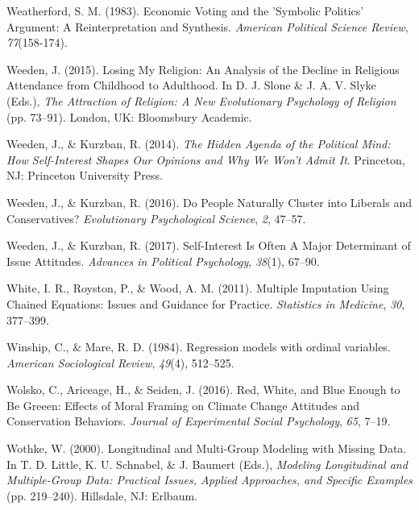 \documentclass[12pt,econ]{sources/authesis}
\newenvironment{CSLReferences}%
  {}%
  {\par}
\begin{document}
\begin{CSLReferences}{1}{0}
\leavevmode{}%
Weatherford, S. M. (1983). Economic {Voting} and the '{Symbolic} {Politics}' {Argument}: {A} {Reinterpretation} and {Synthesis}. \emph{American Political Science Review}, \emph{77}(158-174).

\leavevmode{}%
Weeden, J. (2015). {Losing My Religion: An Analysis of the Decline in Religious Attendance from Childhood to Adulthood}. In D. J. Slone \& J. A. V. Slyke (Eds.), \emph{{The Attraction of Religion: A New Evolutionary Psychology of Religion}} (pp. 73--91). London, UK: Bloomsbury Academic.

\leavevmode{}%
Weeden, J., \& Kurzban, R. (2014). \emph{{The Hidden Agenda of the Political Mind: How Self-Interest Shapes Our Opinions and Why We Won't Admit It}}. Princeton, NJ: Princeton University Press.

\leavevmode{}%
Weeden, J., \& Kurzban, R. (2016). {Do People Naturally Cluster into Liberals and Conservatives?} \emph{Evolutionary Psychological Science}, \emph{2}, 47--57.

\leavevmode{}%
Weeden, J., \& Kurzban, R. (2017). {Self-Interest Is Often A Major Determinant of Issue Attitudes}. \emph{Advances in Political Psychology}, \emph{38}(1), 67--90.

\leavevmode{}%
White, I. R., Royston, P., \& Wood, A. M. (2011). {Multiple Imputation Using Chained Equations: Issues and Guidance for Practice}. \emph{Statistics in Medicine}, \emph{30}, 377--399.

\leavevmode{}%
Winship, C., \& Mare, R. D. (1984). Regression models with ordinal variables. \emph{American Sociological Review}, \emph{49}(4), 512--525.

\leavevmode{}%
Wolsko, C., Ariceage, H., \& Seiden, J. (2016). {Red, White, and Blue Enough to Be Greeen: Effects of Moral Framing on Climate Change Attitudes and Conservation Behaviors}. \emph{Journal of Experimental Social Psychology}, \emph{65}, 7--19.

\leavevmode{}%
Wothke, W. (2000). {Longitudinal and Multi-Group Modeling with Missing Data}. In T. D. Little, K. U. Schnabel, \& J. Baumert (Eds.), \emph{{Modeling Longitudinal and Multiple-Group Data: Practical Issues, Applied Approaches, and Specific Examples}} (pp. 219--240). Hillsdale, NJ: Erlbaum.


\end{CSLReferences}
\end{document}
